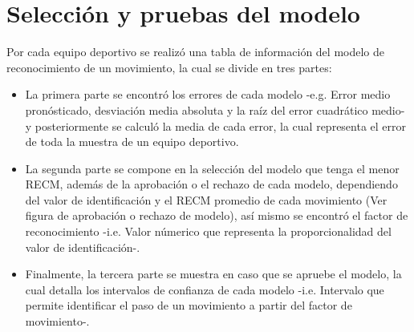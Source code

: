 \section{Selecci\'on y pruebas del modelo} \label{res:chooseModel}
Por cada equipo deportivo se realiz\'o una tabla de informaci\'on del modelo de reconocimiento de un movimiento, la cual se divide en tres partes:
\begin{itemize}
\item  La primera parte se encontr\'o los errores de cada modelo -e.g. Error medio pron\'osticado, desviaci\'on media absoluta y la ra\'iz del error cuadr\'atico medio- y posteriormente se calcul\'o la media de cada error, la cual representa el error de toda la muestra de un equipo deportivo.
\item  La segunda parte se compone en la selecci\'on del modelo que tenga el menor RECM, adem\'as de la aprobaci\'on o el rechazo de cada modelo, dependiendo del valor de identificaci\'on y el RECM promedio de cada movimiento (Ver figura de aprobaci\'on o rechazo de modelo), as\'i mismo se encontr\'o el factor de reconocimiento  -i.e. Valor n\'umerico que representa la proporcionalidad del valor de identificaci\'on-.
\item Finalmente, la tercera parte se muestra en caso que se apruebe el modelo, la cual detalla los intervalos de confianza de cada modelo -i.e. Intervalo que permite identificar el paso de un movimiento a partir del factor de movimiento-.
\end{itemize}
